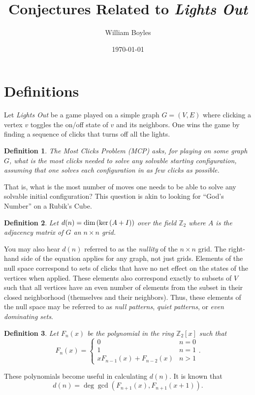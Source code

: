 \documentclass[a4paper]{article}
\newtheorem{definition}{Definition}
\newcommand{\Z}{\mathbb{Z}}
\renewcommand{\dim}[1]{\textnormal{dim}\left( #1 \right)}
\begin{document}
	\title{Conjectures Related to \textit{Lights Out}}
	\author{William Boyles}
	\date{\today}
	\maketitle

	\section{Definitions}
	Let \textit{Lights Out} be a game played on a simple graph $G = (V,E)$ where clicking a vertex $v$ toggles the on/off state of $v$ and its neighbors.
	One wins the game by finding a sequence of clicks that turns off all the lights.

	\begin{definition}
		The Most Clicks Problem (MCP) asks, for playing on some graph $G$, what is the most clicks needed to solve any solvable starting configuration, assuming that one solves each configuration in as few clicks as possible.
	\end{definition}
	That is, what is the most number of moves one needs to be able to solve any solvable initial configuration?
	This question is akin to looking for ``God's Number'' on a Rubik's Cube.

	\begin{definition}
		Let $d(n) = \dim{\ker{(A + I)}}$ over the field $\Z_2$ where $A$ is the adjacency matrix of $G$ an $n \times n$ grid.
	\end{definition}
	You may also hear $d(n)$ referred to as the \textit{nullity} of the $n \times n$ grid.
	The right-hand side of the equation applies for any graph, not just grids.
	Elements of the null space correspond to sets of clicks that have no net effect on the states of the vertices when applied.
	These elements also correspond exactly to subsets of $V$ such that all vertices have an even number of elements from the subset in their closed neighborhood (themselves and their neighbors).
	Thus, these elements of the null space may be referred to as \textit{null patterns}, \textit{quiet patterns}, or \textit{even dominating sets}.

	\begin{definition}\label{def-polys}
		Let $F_n(x)$ be the polynomial in the ring $\Z_2[x]$ such that
		\begin{equation*}
			F_n(x) = \begin{cases}
				0 & n = 0 \\
				1 & n = 1 \\
				x F_{n-1}(x) + F_{n-2}(x) & n > 1
			\end{cases}.
		\end{equation*}
	\end{definition}
	These polynomials become useful in calculating $d(n)$.
	It is known that
	\begin{equation*}
		d(n) = \deg{\gcd{\left(F_{n+1}(x), F_{n+1}(x+1)\right)}}.
	\end{equation*}
\end{document}
